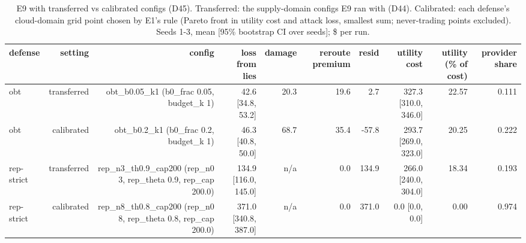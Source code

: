 \begin{table}[t]
\centering
\small
\caption{E9 with transferred vs calibrated configs (D45). Transferred: the supply-domain configs E9 ran with (D44). Calibrated: each defense's cloud-domain grid point chosen by E1's rule (Pareto front in utility cost and attack loss, smallest sum; never-trading points excluded). Seeds 1-3, mean [95\% bootstrap CI over seeds]; \$ per run.}
\label{tab:e9_calibration}
\begin{tabular}{lrrrrrrrrr}
\toprule
defense & setting & config & loss from lies & damage & reroute premium & resid & utility cost & utility (\% of cost) & provider share \\
\midrule
obt & transferred & obt\_b0.05\_k1 (b0\_frac 0.05, budget\_k 1) & 42.6 [34.8, 53.2] & 20.3 & 19.6 & 2.7 & 327.3 [310.0, 346.0] & 22.57 & 0.111 \\
obt & calibrated & obt\_b0.2\_k1 (b0\_frac 0.2, budget\_k 1) & 46.3 [40.8, 50.0] & 68.7 & 35.4 & -57.8 & 293.7 [269.0, 323.0] & 20.25 & 0.222 \\
rep-strict & transferred & rep\_n3\_th0.9\_cap200 (rep\_n0 3, rep\_theta 0.9, rep\_cap 200.0) & 134.9 [116.0, 145.0] & n/a & 0.0 & 134.9 & 266.0 [240.0, 304.0] & 18.34 & 0.193 \\
rep-strict & calibrated & rep\_n8\_th0.8\_cap200 (rep\_n0 8, rep\_theta 0.8, rep\_cap 200.0) & 371.0 [340.8, 387.0] & n/a & 0.0 & 371.0 & 0.0 [0.0, 0.0] & 0.00 & 0.974 \\
\bottomrule
\end{tabular}
\end{table}
